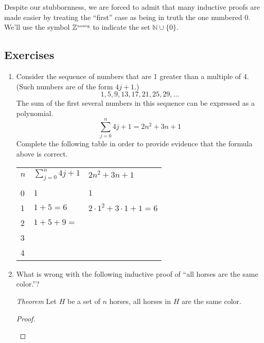 \documentclass[10pt,]{book}
\theoremstyle{plain}
\theoremstyle{definition}
\theoremstyle{definition}
\numberwithin{equation}{section}
\newcommand{\hrulethin}  {\noalign{\hrule height 0.04em}}
\renewcommand{\Naturals}{{\mathbb Z}^{\mbox{\tiny noneg}} }
\newcommand{\hint}[1]{ }
\newcommand{\inlinehint}[1]{ }
\newcommand{\Naturals}{{\mathbb N}}
\begin{document}
    Despite our stubbornness, we are forced to admit that many inductive proofs are
    made easier by treating the ``first'' case as being in truth the one numbered \(0\). We'll
    use the symbol \(\Naturals\) to indicate the set \({\mathbb N} \cup \{ 0 \}\).
\typeout{************************************************}
\typeout{************************************************}
\subsection[{Exercises}]{Exercises}\label{exercises-26}
\leavevmode%
\begin{enumerate}[label=(\alph*)]
\item\hypertarget{li-359}{}
        Consider the sequence of numbers that are 1 greater than a multiple of 4.
        (Such numbers are of the form \(4j+1\).)
        \begin{equation*}
          1, 5, 9, 13, 17, 21, 25, 29, \ldots
        \end{equation*}
        The sum of the first several numbers in this sequence can be expressed as
        a polynomial.
        \begin{equation*}
          \sum_{j=0}^n 4j+1 = 2n^2 + 3n + 1
        \end{equation*}
        Complete the following table in order to provide evidence that the formula
        above is correct.
        \begin{tabular}{lll}
\(n\)&\(\sum_{j=0}^n 4j+1\)&\(2n^2 + 3n + 1\)\tabularnewline[0pt]
&&\tabularnewline\hrulethin
0&\(1\)&\(1\)\tabularnewline[0pt]
1&\(1 + 5 = 6\)&\(2 \cdot 1^2 + 3 \cdot 1 + 1 = 6\)\tabularnewline[0pt]
2&\(1 + 5 + 9 =\) \inlinehint{\(15\)}&\inlinehint{\(2 \cdot 2^2 + 3 \cdot 2 + 1 = 15\)}\tabularnewline[0pt]
3&\inlinehint{\(1 + 5 + 9 + 13 = 28\)}&\inlinehint{\(2 \cdot 3^2 + 3 \cdot 3 + 1 = 28\)}\tabularnewline[0pt]
4&&
\end{tabular}

        \hint{I'm leaving the very last one for you to do.}
\item\hypertarget{ex_horses}{}
      What is wrong with the following inductive proof of
      ``all horses are the same color.''?

      \emph{Theorem} Let \(H\) be a set of \(n\) horses, all horses in \(H\) 
      are the same color.

      \begin{proof}\hypertarget{proof-27}{}


\end{proof}
\end{enumerate}
\end{document}
